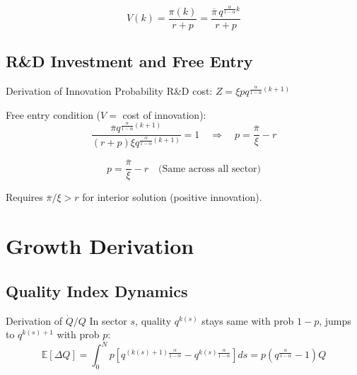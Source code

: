 \documentclass[a4paper,11pt]{article}
\begin{document}
\[
\boxed{V(k) = \frac{\pi(k)}{r + p} = \frac{\overline{\pi} \, q^{\frac{\alpha}{1-\alpha}k}}{r + p}}
\tag{Firm Value}
\]

\subsection*{R\&D Investment and Free Entry}
\begin{derivationbox}{Derivation of Innovation Probability}
R\&D cost: $Z = \xi p q^{\frac{\alpha}{1-\alpha}(k+1)}$

Free entry condition ($V =$ cost of innovation):
\[
\frac{\overline{\pi} q^{\frac{\alpha}{1-\alpha}(k+1)}}{(r+p)\xi q^{\frac{\alpha}{1-\alpha}(k+1)}} = 1 \quad \Rightarrow \quad p = \frac{\overline{\pi}}{\xi} - r
\]
\end{derivationbox}

\[
\boxed{p = \frac{\overline{\pi}}{\xi} - r}
\quad \text{(Same across all sector)}
\tag{Innovation Prob}
\]

\begin{warningbox}
Requires $\overline{\pi}/\xi > r$ for interior solution (positive innovation).
\end{warningbox}

\clearpage

\section{Growth Derivation}

\subsection*{Quality Index Dynamics}
\begin{derivationbox}{Derivation of $\dot{Q}/Q$}
In sector $s$, quality $q^{k(s)}$ stays same with prob $1-p$, jumps to $q^{k(s)+1}$ with prob $p$:
\[
\mathbb{E}[\Delta Q] = \int_0^N p\left[q^{(k(s)+1)\frac{\alpha}{1-\alpha}} - q^{k(s)\frac{\alpha}{1-\alpha}}\right]ds
= p(q^{\frac{\alpha}{1-\alpha}} - 1)Q
\]
\end{derivationbox}

\end{document}
